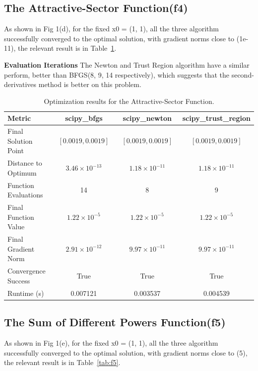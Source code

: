 \documentclass[12pt]{article}
\begin{document}
\subsection{The Attractive-Sector Function(f4)}
As shown in  Fig 1(d), for the fixed x0 = (1, 1), all the three algorithm  successfully converged to the optimal solution, with gradient norms close to (1e-11), the relevant result is in Table~\ref{tab:f4}.

\textbf{Evaluation Iterations}  
The Newton and Trust Region algorithm have a similar perform, better than BFGS(8, 9, 14 respectively), which suggests that the second-derivatives method is better on this problem.

\begin{table}[h]
    \centering
    \begin{tabular}{lccc}
        \toprule
        Metric & scipy\_bfgs & scipy\_newton & scipy\_trust\_region \\
        \midrule
        Final Solution Point & 
        $\begin{array}{c} [0.0019, 0.0019] \end{array}$ & 
        $\begin{array}{c} [0.0019, 0.0019] \end{array}$ & 
        $\begin{array}{c} [0.0019, 0.0019] \end{array}$ \\
        Distance to Optimum & $3.46\times10^{-13}$ & $1.18\times10^{-11}$ & $1.18\times10^{-11}$ \\
        Function Evaluations & 14 & 8 & 9 \\
        Final Function Value & $1.22\times10^{-5}$ & $1.22\times10^{-5}$ & $1.22\times10^{-5}$ \\
        Final Gradient Norm & $2.91\times10^{-12}$ & $9.97\times10^{-11}$ & $9.97\times10^{-11}$ \\
        Convergence Success & True & True & True \\
        Runtime (s) & 0.007121 & 0.003537 & 0.004539 \\
        \bottomrule
    \end{tabular}
    \caption{Optimization results for the Attractive-Sector Function.}
    \label{tab:f4}
\end{table}

\subsection{The Sum of Different Powers Function(f5)}
As shown in  Fig 1(e), for the fixed x0 = (1, 1), all the three algorithm  successfully converged to the optimal solution, with gradient norms close to (5), the relevant result is in Table~\ref{tab:f5}.
\end{document}
